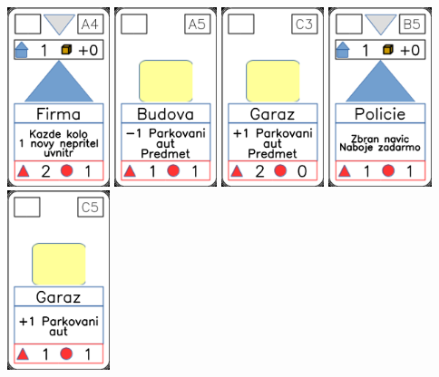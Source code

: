 \documentclass[a4paper]{article}
\begin{document}
	\includegraphics[width=3.0cm]{img-3_18}
	\includegraphics[width=3.0cm]{img-2_4}
	\includegraphics[width=3.0cm]{img-2_12}
	\includegraphics[width=3.0cm]{img-3_9}
	\includegraphics[width=3.0cm]{img-2_14}
\end{document}
